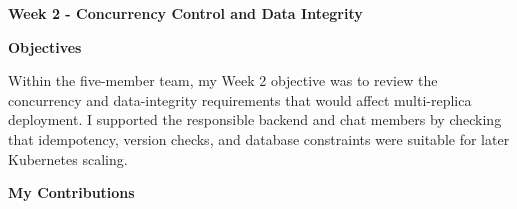 \vspace{0.5em}\noindent\textbf{Week 2 - Concurrency Control and Data
Integrity}\par

\vspace{0.5em}\noindent\textbf{Objectives}\par

Within the five-member team, my Week 2 objective was to review the
concurrency and data-integrity requirements that would affect
multi-replica deployment. I supported the responsible backend and chat
members by checking that idempotency, version checks, and database
constraints were suitable for later Kubernetes scaling.

\vspace{0.5em}\noindent\textbf{My Contributions}\par

